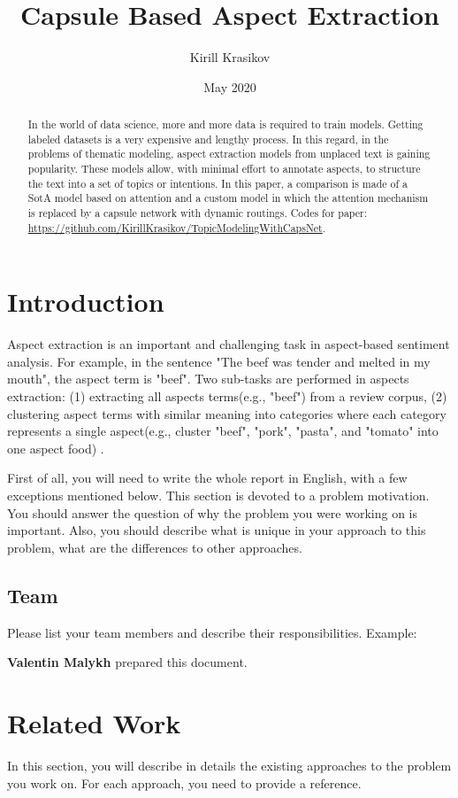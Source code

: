 \documentclass{article}
\title{Capsule Based Aspect Extraction}
\author{Kirill Krasikov}
\date{May 2020}
\begin{document}
\maketitle
\begin{abstract}
    In the world of data science, more and more data is required to train models. Getting labeled datasets is a very expensive and lengthy process. In this regard, in the problems of thematic modeling, aspect extraction models from unplaced text is gaining popularity. These models allow, with minimal effort to annotate aspects, to structure the text into a set of topics or intentions. In this paper, a comparison is made of a SotA model based on attention and a custom model in which the attention mechanism is replaced by a capsule network with dynamic routings.
    Codes for paper: \url{https://github.com/KirillKrasikov/TopicModelingWithCapsNet}.
\end{abstract}



\section{Introduction}
Aspect extraction is an important and challenging task in aspect-based sentiment analysis. For example, in the sentence "The beef was tender and melted in my mouth", the aspect term is "beef". Two sub-tasks are performed in aspects extraction: (1) extracting all aspects terms(e.g., "beef") from a review corpus, (2) clustering aspect terms with similar meaning into categories where each category represents a single aspect(e.g., cluster "beef", "pork", "pasta", and "tomato" into one aspect food) \cite{He2018ABAE}.

First of all, you will need to write the whole report in English, with a few exceptions mentioned below.
This section is devoted to a problem motivation. You should answer the question of why the problem you were working on is important. Also, you should describe what is unique in your approach to this problem, what are the differences to other approaches.
\subsection{Team}
Please list your team members and describe their responsibilities. Example:

\textbf{Valentin Malykh} prepared this document.



\section{Related Work}
\label{sec:related}
In this section, you will describe in details the existing approaches to the problem you work on. For each approach, you need to provide a reference. 
\end{document}
